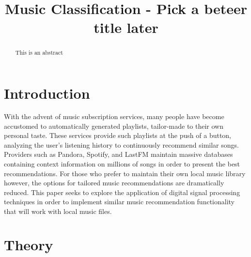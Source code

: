 \documentclass[conference]{IEEEtran}
\begin{document}
\title{Music Classification - Pick a beteer title later}
\author{
  \and
  \and
  }

\maketitle
\begin{abstract}
  This is an abstract
\end{abstract}

\section{Introduction}
With the advent of music subscription services, many people have become accustomed to automatically generated playlists, tailor-made to their own personal taste. These services provide such playlists at the push of a button, analyzing the user's listening history to continuously recommend similar songs. Providers such as Pandora, Spotify, and LastFM maintain massive databases containing context information on millions of songs in order to present the best recommendations. For those who prefer to maintain their own local music library however, the options for tailored music recommendations are dramatically reduced. This paper seeks to explore the application of digital signal processing techniques in order to implement similar music recommendation functionality that will work with local music files.
\section{Theory}
\end{document}
